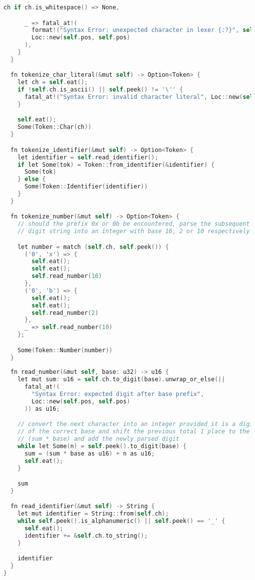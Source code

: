 \begin{lstlisting}[language=C]
      ch if ch.is_whitespace() => None,

      _ => fatal_at!(
        format!("Syntax Error: unexpected character in lexer {:?}", self.ch),
        Loc::new(self.pos, self.pos)
      ),
    }
  }

  fn tokenize_char_literal(&mut self) -> Option<Token> {
    let ch = self.eat();
    if !self.ch.is_ascii() || self.peek() != '\'' {
      fatal_at!("Syntax Error: invalid character literal", Loc::new(self.pos - 1, self.pos - 1))
    }

    self.eat();
    Some(Token::Char(ch))
  }

  fn tokenize_identifier(&mut self) -> Option<Token> {
    let identifier = self.read_identifier();
    if let Some(tok) = Token::from_identifier(&identifier) {
      Some(tok)
    } else {
      Some(Token::Identifier(identifier))
    }
  }

  fn tokenize_number(&mut self) -> Option<Token> {
    // should the prefix 0x or 0b be encountered, parse the subsequent 
    // digit string into an integer with base 16, 2 or 10 respectively

    let number = match (self.ch, self.peek()) {
      ('0', 'x') => {
        self.eat();
        self.eat();
        self.read_number(16)
      },
      ('0', 'b') => {
        self.eat();
        self.eat();
        self.read_number(2)
      },
      _ => self.read_number(10)
    };

    Some(Token::Number(number))
  }
  
  fn read_number(&mut self, base: u32) -> u16 {
    let mut sum: u16 = self.ch.to_digit(base).unwrap_or_else(|| 
      fatal_at!(
        "Syntax Error: expected digit after base prefix", 
        Loc::new(self.pos, self.pos)
      )) as u16;

    // convert the next character into an integer provided it is a digit 
    // of the correct base and shift the previous total 1 place to the left 
    // (sum * base) and add the newly parsed digit 
    while let Some(n) = self.peek().to_digit(base) {
      sum = (sum * base as u16) + n as u16;
      self.eat();
    }

    sum
  }

  fn read_identifier(&mut self) -> String {
    let mut identifier = String::from(self.ch);
    while self.peek().is_alphanumeric() || self.peek() == '_' {
      self.eat();
      identifier += &self.ch.to_string(); 
    }

    identifier
  }
}
\end{lstlisting}

